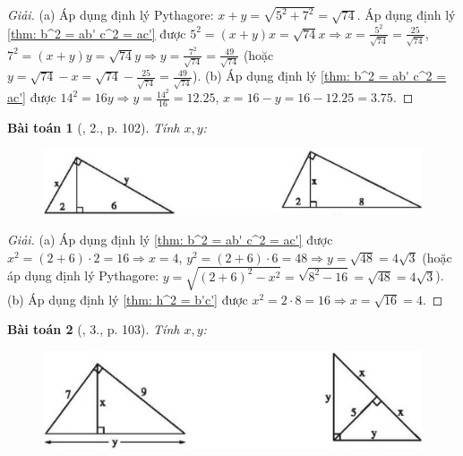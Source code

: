 \documentclass{article}
\newtheorem{baitoan}{Bài toán}
\begin{document}
\begin{proof}[Giải]
	(a) Áp dụng định lý Pythagore: $x + y = \sqrt{5^2 + 7^2} = \sqrt{74}$. Áp dụng định lý \ref{thm: b^2 = ab' c^2 = ac'} được $5^2 = (x + y)x = \sqrt{74}x\Rightarrow x = \frac{5^2}{\sqrt{74}} = \frac{25}{\sqrt{74}}$, $7^2 = (x + y)y = \sqrt{74}y\Rightarrow y = \frac{7^2}{\sqrt{74}} = \frac{49}{\sqrt{74}}$ (hoặc $y = \sqrt{74} - x = \sqrt{74} - \frac{25}{\sqrt{74}} = \frac{49}{\sqrt{74}}$). (b) Áp dụng định lý \ref{thm: b^2 = ab' c^2 = ac'} được $14^2 = 16y\Rightarrow y = \frac{14^2}{16} = 12.25$, $x = 16 - y = 16 - 12.25 = 3.75$.
\end{proof}

\begin{baitoan}[\cite{SBT_Toan_9_tap_1}, 2., p. 102]
	Tính $x,y$:
	\begin{figure}[H]
		\centering
		\includegraphics[scale=.25]{SBT_Toan_9_2_p102}
	\end{figure}
\end{baitoan}

\begin{proof}[Giải]
	(a) Áp dụng định lý \ref{thm: b^2 = ab' c^2 = ac'} được $x^2 = (2 + 6)\cdot2 = 16\Rightarrow x = 4$, $y^2 = (2 + 6)\cdot6 = 48\Rightarrow y = \sqrt{48} = 4\sqrt{3}$ (hoặc áp dụng định lý Pythagore: $y = \sqrt{(2 + 6)^2 - x^2} = \sqrt{8^2 - 16} = \sqrt{48} = 4\sqrt{3}$). (b) Áp dụng định lý \ref{thm: h^2 = b'c'} được $x^2 = 2\cdot8 = 16\Rightarrow x = \sqrt{16} = 4$.
\end{proof}

\begin{baitoan}[\cite{SBT_Toan_9_tap_1}, 3., p. 103]
	Tính $x,y$:
	\begin{figure}[H]
		\centering
		\includegraphics[scale=.25]{SBT_Toan_9_3_p103}
	\end{figure}
\end{baitoan}
\end{document}
